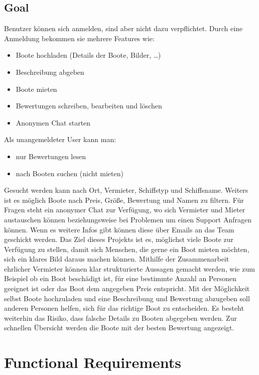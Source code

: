 \documentclass[12pt]{article}
\theoremstyle{definition}
\newenvironment{explanation}{%
   \setlength{\parindent}{0pt}
   \itshape
   \color{blue}
}{}
\begin{document}
\subsection{Goal}
\begin{explanation}
	Benutzer können sich anmelden, sind aber nicht dazu verpflichtet. Durch eine Anmeldung
	bekommen sie mehrere Features wie:
	\begin{itemize}
		\item Boote hochladen (Details der Boote, Bilder, …)
		\item Beschreibung abgeben
		\item Boote mieten
		\item Bewertungen schreiben, bearbeiten und löschen
		\item Anonymen Chat starten
	\end{itemize}
	Als unangemeldeter User kann man:
	\begin{itemize}
		\item nur Bewertungen lesen
		\item nach Booten suchen (nicht mieten)
	\end{itemize}
	Gesucht werden kann nach Ort, Vermieter, Schiffstyp und Schiffsname. Weiters ist es möglich Boote nach Preis, Größe, Bewertung und Namen zu filtern.
	Für Fragen steht ein anonymer Chat zur Verfügung, wo sich Vermieter und Mieter austauschen können beziehungsweise bei Problemen um einen Support Anfragen können. Wenn es weitere Infos gibt können diese über Emails an das Team geschickt werden.
	Das Ziel dieses Projekts ist es, möglichst viele Boote zur Verfügung zu stellen, damit sich Menschen, die gerne ein Boot mieten möchten, sich ein klares Bild daraus machen können. Mithilfe der Zusammenarbeit ehrlicher Vermieter können klar strukturierte Aussagen gemacht werden, wie zum Beispiel ob ein Boot beschädigt ist, für eine bestimmte Anzahl an Personen geeignet ist oder das Boot dem angegeben Preis entspricht. Mit der Möglichkeit selbst Boote hochzuladen und eine Beschreibung und Bewertung abzugeben soll anderen Personen helfen, sich für das richtige Boot zu entscheiden. Es besteht weiterhin das Risiko, dass falsche Details zu Booten abgegeben werden. Zur schnellen Übersicht werden die Boote mit der besten Bewertung angezeigt.
\end{explanation}
\pagebreak

\section{Functional Requirements}
\end{document}
